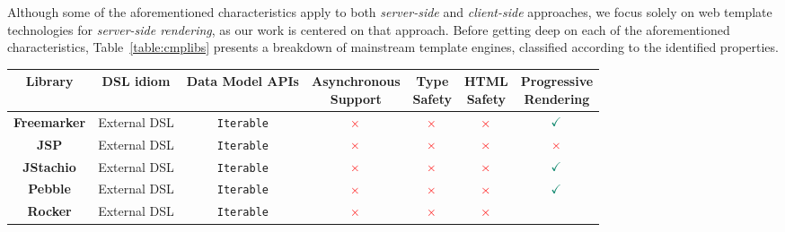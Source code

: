 Although some of the aforementioned characteristics apply to both
\textit{server-side} and \textit{client-side} approaches, we focus solely on
web template technologies for \textit{server-side rendering}, as our work is
centered on that approach. Before getting deep on each of the aforementioned
characteristics, Table~\ref{table:cmplibs} presents a breakdown of mainstream
template engines, classified according to the identified properties.

\begin{table}[h]
  \small
  \tabcolsep=0.1cm
  \def\arraystretch{1.2}
  \begin{tabular}{|c|c|c|c|c|c|c|}
    \hline
    \textbf{Library}
     & \textbf{DSL idiom}
     & \textbf{Data Model APIs}
     & \shortstack{\textbf{Asynchronous}           \\\textbf{Support}}
     & \shortstack{\textbf{Type}                   \\\textbf{Safety}}
     & \shortstack{\textbf{HTML}                   \\\textbf{Safety}}
     & \shortstack{\textbf{Progressive}            \\\textbf{Rendering}}
    \\
    \hline
    \textbf{Freemarker}
     & External DSL
     & \texttt{Iterable}
     & \large{$\textcolor{red}{\times}$}
     & \large{$\textcolor{red}{\times}$}
     & \large{$\textcolor{red}{\times}$}
     & \large{$\textcolor{PineGreen}{\checkmark}$}
    \\
    \hline
    \textbf{JSP}
     & External DSL
     & \texttt{Iterable}
     & \large{$\textcolor{red}{\times}$}
     & \large{$\textcolor{red}{\times}$}
     & \large{$\textcolor{red}{\times}$}
     & \large{$\textcolor{red}{\times}$}
    \\
    \hline
    \textbf{JStachio}
     & External DSL
     & \texttt{Iterable}
     & \large{$\textcolor{red}{\times}$}
     & \large{$\textcolor{red}{\times}$}
     & \large{$\textcolor{red}{\times}$}
     & \large{$\textcolor{PineGreen}{\checkmark}$}
    \\\hline
    \textbf{Pebble}
     & External DSL
     & \texttt{Iterable}
     & \large{$\textcolor{red}{\times}$}
     & \large{$\textcolor{red}{\times}$}
     & \large{$\textcolor{red}{\times}$}
     & \large{$\textcolor{PineGreen}{\checkmark}$}
    \\
    \hline
    \textbf{Rocker}
     & External DSL
     & \texttt{Iterable}
     & \large{$\textcolor{red}{\times}$}
     & \large{$\textcolor{red}{\times}$}
     & \large{$\textcolor{red}{\times}$}

\end{tabular}
\end{table}
